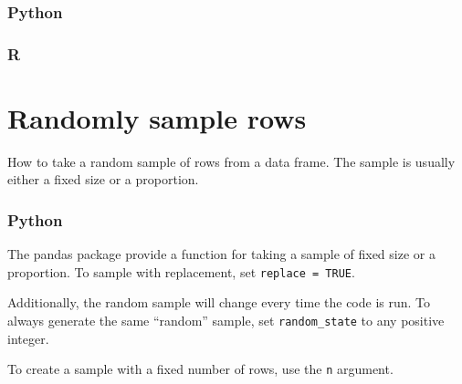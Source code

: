 \documentclass[
]{book}
\begin{document}
\hypertarget{python-26}{%
\subsubsection*{Python}\label{python-26}}

\hypertarget{r-26}{%
\subsubsection*{R}\label{r-26}}

\hypertarget{randomly-sample-rows}{%
\section{Randomly sample rows}\label{randomly-sample-rows}}

How to take a random sample of rows from a data frame. The sample is usually either a fixed size or a proportion.

\hypertarget{python-27}{%
\subsubsection*{Python}\label{python-27}}

The pandas package provide a function for taking a sample of fixed size or a proportion. To sample with replacement, set \texttt{replace\ =\ TRUE}.

Additionally, the random sample will change every time the code is run. To always generate the same ``random'' sample, set \texttt{random\_state} to any positive integer.

To create a sample with a fixed number of rows, use the \texttt{n} argument.
\end{document}
